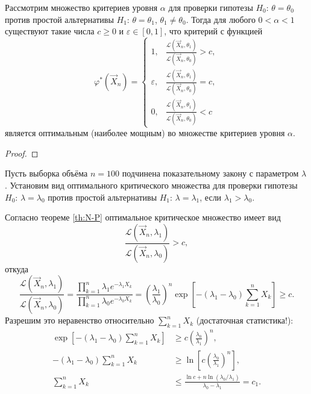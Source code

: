 \begin{theorem}\label{th:N-P}
	Рассмотрим множество критериев уровня $ \alpha $ для проверки гипотезы $ H_0
	$: $ \theta = \theta_0 $ против простой альтернативы $ H_1 $: $ \theta =
	\theta_1 $, $ \theta_1 \neq \theta_0 $. Тогда для любого $ 0 < \alpha < 1 $
	существуют такие числа $ c \geqslant 0 $ и $ \varepsilon \in [0, 1] $, что
	критерий с функцией  
	\[
	\varphi^\ast(\vec X_n) = \begin{cases} 1, & \frac{\mathscr L(\vec X_n,
		\theta_1)}{\mathscr L(\vec X_n, \theta_0)} > c,\\[0.4em]
		\varepsilon, & \frac{\mathscr L(\vec X_n, \theta_1)}{\mathscr L(\vec X_n, \theta_0)} =
		c,\\[0.4em]
		0, & \frac{\mathscr L(\vec X_n, \theta_1)}{\mathscr L(\vec X_n, \theta_0)} < c
	\end{cases}
	\]
является оптимальным (наиболее мощным) во множестве критериев уровня $ \alpha $.	
\end{theorem}
\begin{proof}
\end{proof}

\begin{ex} 
	Пусть выборка объёма $ n = 100 $ подчинена показательному закону с параметром
	$ \lambda $. Установим вид оптимального критического множества для проверки
	гипотезы $ H_0 $: $ \lambda = \lambda_0 $ против простой альтернативы $ H_1 $:
	$ \lambda = \lambda_1 $, если $ \lambda_1 > \lambda_0 $.
  \begin{solution}
		Согласно теореме \ref{th:N-P} оптимальное критическое множество имеет вид 
		\[
				\frac{\mathscr L(\vec X_n, \lambda_1)}{\mathscr L(\vec X_n, \lambda_0)} > c,
		\]
		откуда  
		\[
				\frac{\mathscr L(\vec X_n, \lambda_1)}{\mathscr L(\vec X_n, \lambda_0)} =
				\frac{\prod^n_{k=1} \lambda_1 e^{-\lambda_1 X_k}}{\prod_{k=1}^n
				\lambda_0 e^{-\lambda_0 X_k}} = \left( \frac{\lambda_1}{\lambda_0}
			\right)^n \exp\left[-\left(\lambda_1 - \lambda_0\right) \sum_{k=1}^n X_k\right] \geqslant c.
		\]
		Разрешим это неравенство относительно $ \sum_{k=1}^n X_k $ (достаточная
		статистика!): 
		\begin{align*}
				\exp\left[-\left(\lambda_1 - \lambda_0\right) \sum_{k=1}^n X_k\right]
				&\geqslant c \left( \frac{\lambda_0}{\lambda_1} \right)^n,\\
        -(\lambda_1 - \lambda_0) \sum_{k=1}^n X_k &\geqslant \ln \left[ c \left(
				\frac{\lambda_0}{\lambda_1}\right)^n  \right],\\
						\sum_{k=1}^n X_k &\leqslant \frac{\ln c + n \ln
				(\lambda_0/\lambda_1)}{\lambda_0 - \lambda_1} = c_1.
		\end{align*}

	\end{solution}	
\end{ex}

